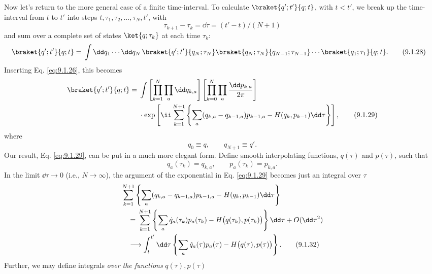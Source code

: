 Now let's return to the more general case of a finite time-interval. To
calculate $\braket{q';t'}{q;t}$, with $t<t'$, we break up the time-interval
from $t$ to $t'$ into steps $t,\tau_1,\tau_2,\ldots,\tau_N,t'$, with
\begin{equation}
  \tau_{k+1}-\tau_k=\dd\tau=(t'-t)/(N+1)
  \tag{9.1.27}\label{eq:9.1.27}
\end{equation}
and sum over a complete set of states $\ket{q;\tau_k}$ at each time
$\tau_k$:
\begin{align}
  \braket{q';t'}{q;t}
  ={}&\int \dd q_1\cdots \dd q_N\,\braket{q';t'}{q_N;\tau_N}
  \braket{q_N;\tau_N}{q_{N-1};\tau_{N-1}}\cdots
  \braket{q_1;\tau_1}{q;t}.
  \tag{9.1.28}\label{eq:9.1.28}
\end{align}
Inserting Eq. \eqref{eq:9.1.26}, this becomes
\begin{align}
  \braket{q';t'}{q;t}
  ={}&\int
  \left[\prod_{k=1}^{N}\prod_a \dd q_{k,a}\right]
  \left[\prod_{k=0}^{N}\prod_a\frac{\dd p_{k,a}}{2\pi}\right]\notag \\
  &\cdot \exp\left[\ii\sum_{k=1}^{N+1}
  \left\{\sum_a(q_{k,a}-q_{k-1,a})p_{k-1,a}
  -H(q_k,p_{k-1})\dd\tau\right\}\right],
  \tag{9.1.29}\label{eq:9.1.29}
\end{align}
where
\begin{equation}
  q_0\equiv q,
  \qquad
  q_{N+1}\equiv q'.
  \tag{9.1.30}\label{eq:9.1.30}
\end{equation}
Our result, Eq. \eqref{eq:9.1.29}, can be put in a much more elegant form. Define
smooth interpolating functions, $q(\tau)$ and $p(\tau)$, such that
\begin{equation}
  q_a(\tau_k)=q_{k,a},
  \qquad
  p_a(\tau_k)=p_{k,a}.
  \tag{9.1.31}\label{eq:9.1.31}
\end{equation}
In the limit $\dd\tau\to0$ (i.e., $N\to\infty$), the argument of the
exponential in Eq. \eqref{eq:9.1.29} becomes just an integral over $\tau$
\begin{align}
  &\sum_{k=1}^{N+1}\left\{\sum_a(q_{k,a}-q_{k-1,a})p_{k-1,a}
  -H(q_k,p_{k-1})\dd\tau\right\}
  \notag\\
  &\quad={}
  \sum_{k=1}^{N+1}\left\{\sum_a\dot q_a(\tau_k)p_a(\tau_k)
  -H\bigl(q(\tau_k),p(\tau_k)\bigr)\right\}\dd\tau+O(\dd\tau^2)
  \notag\\
  &\quad\longrightarrow
  \int_t^{t'}\dd\tau\left\{\sum_a\dot q_a(\tau)p_a(\tau)
  -H\bigl(q(\tau),p(\tau)\bigr)\right\}.
  \tag{9.1.32}\label{eq:9.1.32}
\end{align}
Further, we may define integrals \emph{over the functions} $q(\tau),p(\tau)$

